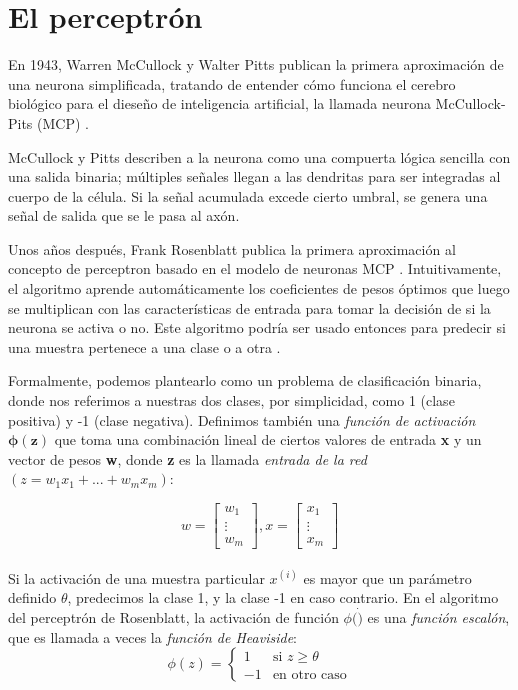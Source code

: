 \section{El perceptrón}
En 1943, Warren McCullock y Walter Pitts publican la primera aproximación de una
neurona simplificada, tratando de entender cómo funciona el cerebro biológico para
el dieseño de inteligencia artificial, la llamada neurona McCullock-Pits (MCP) \cite{mcp}.

McCullock y Pitts describen a la neurona como una compuerta lógica sencilla con una
salida binaria; múltiples señales llegan a las dendritas para ser integradas al cuerpo
de la célula. Si la señal acumulada excede cierto umbral, se genera una señal de salida
que se le pasa al axón.

Unos años después, Frank Rosenblatt publica la primera aproximación al concepto de
perceptron basado en el modelo de neuronas MCP \cite{rosenblatt}. Intuitivamente, el algoritmo
aprende automáticamente los coeficientes de pesos óptimos que luego se multiplican
con las características de entrada para tomar la decisión de si la neurona se activa
o no. Este algoritmo podría ser usado entonces para predecir si una muestra pertenece
a una clase o a otra \cite{python}.

Formalmente, podemos plantearlo como un problema de clasificación binaria, donde nos
referimos a nuestras dos clases, por simplicidad, como 1 (clase positiva) y -1
(clase negativa). Definimos también una \textit{función de activación $\mathbf{\phi (z)}$}
que toma una combinación lineal de ciertos valores de entrada \textbf{x} y un
vector de pesos \textbf{w}, donde \textbf{z} es la llamada \textit{entrada de la red}
$(z = w_1x_1 + ... + w_mx_m)$:

\begin{equation*}
w=
    \begin{bmatrix}
        w_1 \\
        \vdots \\
        w_m
    \end{bmatrix}
    , x=
    \begin{bmatrix}
      x_1 \\
      \vdots \\
      x_m
    \end{bmatrix}
\end{equation*}
\\
Si la activación de una muestra particular $x^{(i)}$ es mayor que un parámetro definido
$\theta$, predecimos la clase 1, y la clase -1 en caso contrario. En el algoritmo
del perceptrón de Rosenblatt, la activación de función $\phi (\dot)$ es una \textit{función escalón},
que es llamada a veces la \textit{función de Heaviside}:
\begin{equation*}
  \phi(z)= \left\{ \begin{array} {rl}
    1 & \text{si } z \geq \theta \\
    -1 & \text{en otro caso} \end{array} \right.
\end{equation*}

